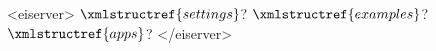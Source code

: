 <eiserver>
  $\xmlstructref{settings}$?
  $\xmlstructref{examples}$?
  $\xmlstructref{apps}$?
</eiserver>
